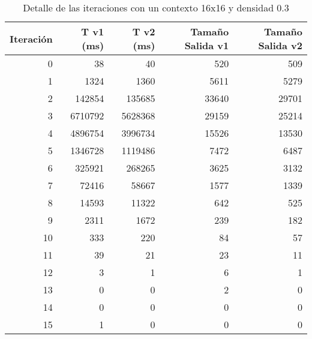	\begin{table}[htbp]
		\caption{Detalle de las iteraciones con un contexto 16x16 y densidad 0.3}
		\begin{center}
			\begin{tabular}{|r|r|r|r|r|}
				\hline
				Iteración  & T v1 (ms) & T v2 (ms) & Tamaño Salida v1  & Tamaño Salida v2  \\ \hline \hline
				0 & 38 & 40 & 520 & 509 \\ \hline
				1 & 1324 & 1360 & 5611 & 5279 \\ \hline
				2 & 142854 & 135685 & 33640 & 29701 \\ \hline
				3 & 6710792 & 5628368 & 29159 & 25214 \\ \hline
				4 & 4896754 & 3996734 & 15526 & 13530 \\ \hline
				5 & 1346728 & 1119486 & 7472 & 6487 \\ \hline
				6 & 325921 & 268265 & 3625 & 3132 \\ \hline
				7 & 72416 & 58667 & 1577 & 1339 \\ \hline
				8 & 14593 & 11322 & 642 & 525 \\ \hline
				9 & 2311 & 1672 & 239 & 182 \\ \hline
				10 & 333 & 220 & 84 & 57 \\ \hline
				11 & 39 & 21 & 23 & 11 \\ \hline
				12 & 3 & 1 & 6 & 1 \\ \hline
				13 & 0 & 0 & 2 & 0 \\ \hline
				14 & 0 & 0 & 0 & 0 \\ \hline
				15 & 1 & 0 & 0 & 0 \\ \hline
			\end{tabular}
		\end{center}
		\label{iteraciones16d3}
	\end{table}
	
		
		
		
		
		
	
		
